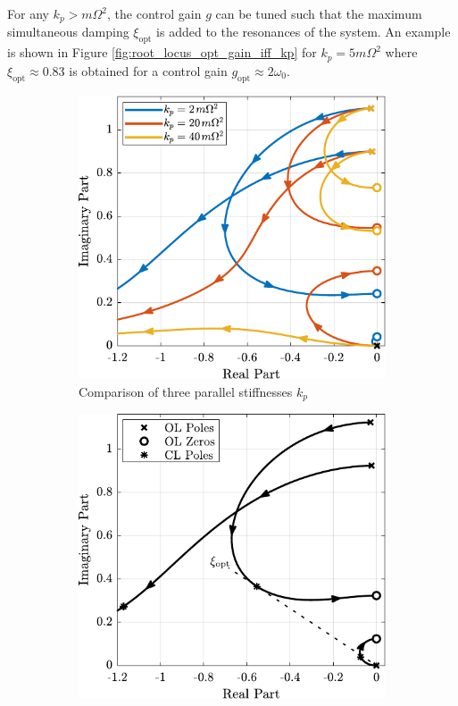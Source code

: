 \documentclass{ISMA_USD2020}
\begin{document}
For any \(k_p > m \Omega^2\), the control gain \(g\) can be tuned such that the maximum simultaneous damping \(\xi_\text{opt}\) is added to the resonances of the system.
An example is shown in Figure \ref{fig:root_locus_opt_gain_iff_kp} for \(k_p = 5 m \Omega^2\) where \(\xi_{\text{opt}} \approx 0.83\) is obtained for a control gain \(g_\text{opt} \approx 2 \omega_0\).

\begin{figure}[htbp]
\begin{subfigure}[c]{0.49\linewidth}
\includegraphics[width=\linewidth]{figs/root_locus_iff_kps.pdf}
\caption{\label{fig:root_locus_iff_kps} Comparison of three parallel stiffnesses \(k_p\)}
\end{subfigure}
\begin{subfigure}[c]{0.49\linewidth}
\includegraphics[width=\linewidth]{figs/root_locus_opt_gain_iff_kp.pdf}

\end{subfigure}
\end{figure}
\end{document}
